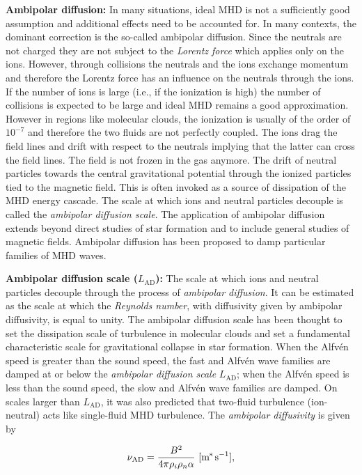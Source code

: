 \documentclass[a4paper,10pt]{article}
\begin{document}
{\noindent}\textbf{Ambipolar diffusion:} In many situations, ideal MHD is not a sufficiently good assumption and additional effects need to be accounted for. In many contexts, the dominant correction is the so-called ambipolar diffusion. Since the neutrals are not charged they are not subject to the \textit{Lorentz force} which applies only on the ions. However, through collisions the neutrals and the ions exchange momentum and therefore the Lorentz force has an influence on the neutrals through the ions. If the number of ions is large (i.e., if the ionization is high) the number of collisions is expected to be large and ideal MHD remains a good approximation. However in regions like molecular clouds, the ionization is usually of the order of $10^{-7}$ and therefore the two fluids are not perfectly coupled. The ions drag the field lines and drift with respect to the neutrals implying that the latter can cross the field lines. The field is not frozen in the gas anymore. The drift of neutral particles towards the central gravitational potential through the ionized particles tied to the magnetic field. This is often invoked as a source of dissipation of the MHD energy cascade. The scale at which ions and neutral particles decouple is called the \textit{ambipolar diffusion scale}. The application of ambipolar diffusion extends beyond direct studies of star formation and to include general studies of magnetic fields. Ambipolar diffusion has been proposed to damp particular families of MHD waves. 

{\noindent}\textbf{Ambipolar diffusion scale ($L_\mathrm{AD}$):} The scale at which ions and neutral particles decouple through the process of \textit{ambipolar diffusion}. It can be estimated as the scale at which the \textit{Reynolds number}, with diffusivity given by ambipolar diffusivity, is equal to unity. The ambipolar diffusion scale has been thought to set the dissipation scale of turbulence in molecular clouds and set a fundamental characteristic scale for gravitational collapse in star formation. When the Alfv\'en speed is greater than the sound speed, the fast and Alfv\'en wave families are damped at or below the \textit{ambipolar diffusion scale} $L_\mathrm{AD}$; when the Alfv\'en speed is less than the sound speed, the slow and Alfv\'en wave families are damped. On scales larger than $L_\mathrm{AD}$, it was also predicted that two-fluid turbulence (ion-neutral) acts like single-fluid MHD turbulence. The \textit{ambipolar diffusivity} is given by

\begin{align*}
    \nu_\mathrm{AD} = \frac{B^2}{4\pi\rho_i\rho_n\alpha} ~ [{\rm m^s\,s^{-1}}],
\end{align*}
\end{document}
